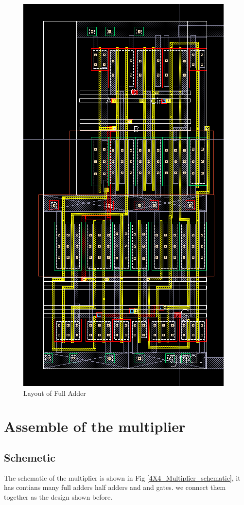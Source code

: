 \documentclass[conference]{IEEEtran}
\begin{document}
\begin{figure}[H]
    \centering
    \includegraphics[width = 0.5\linewidth]{full_adder_layout.png}
    \caption{Layout of Full Adder}
    \label{Layout of Full Adder}
\end{figure}


\section{Assemble of the multiplier}
\label{Assemble}


\subsection{Schemetic}

The schematic of the multiplier is shown in Fig \ref{4X4_Multiplier_schematic}, it has contians many full adders half adders and and gates. we connect them together as the design shown before.
\end{document}

